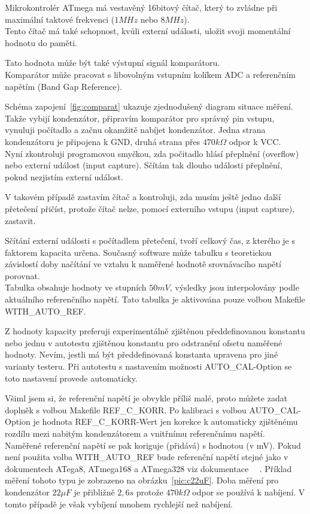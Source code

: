 Mikrokontrolér ATmega má vestavěný 16bitový čítač, který to zvládne při maximální taktové frekvenci (\(1MHz\) nebo \(8MHz\)).\\
Tento čítač má také schopnost, kvůli externí události, uložit svoji momentální hodnotu do paměti.

Tato hodnota může být také výstupní signál komparátoru.\\
Komparátor může pracovat s libovolným vstupním kolíkem ADC a referenčním napětím (Band Gap Reference).

Schéma zapojení~\ref{fig:comparat} ukazuje zjednodušený diagram situace měření.\\
Takže vybijí kondenzátor, připravím komparátor pro správný pin vstupu, vynuluji počítadlo a začnu okamžitě nabíjet kondenzátor.
Jedna strana kondenzátoru je připojena k GND, druhá strana přes \(470k\Omega\) odpor k VCC.\\
Nyní zkontroluji programovou smyčkou, zda počitadlo hlásí přeplnění (overflow) nebo externí událost (input capture).
Sčítám tak dlouho události přeplnění, pokud nezjistím externí událost.

V takovém případě zastavím čítač a kontroluji, zda musím ještě jedno další přetečení přičíst,
protože čítač nelze, pomocí externího vstupu (input capture), zastavit.

Sčítání externí události s počítadlem přetečení, tvoří celkový čas, z kterého je s faktorem kapacita určena.
Současný software může tabulku s teoretickou závislostí doby načítání ve vztahu k naměřené 
hodnotě srovnávacího napětí porovnat.\\
Tabulka obsahuje hodnoty ve stupních \(50mV\), výsledky jsou interpolovány podle aktuálního referenčního napětí.
Tato tabulka je aktivována pouze volbou Makefile WITH\_AUTO\_REF.

Z hodnoty kapacity preferuji experimentálně zjištěnou předdefinovanou konstantu nebo jednu v autotestu
zjištěnou konstantu pro odstranění ofsetu naměřené hodnoty.
Nevím, jestli má být předdefinovaná konstanta upravena pro jiné varianty testeru.
Při autotestu s nastavením možnosti AUTO\_CAL-Option se toto nastavení provede automaticky.

Všiml jsem si, že referenční napětí je obvykle příliš malé, proto můžete zadat doplněk s 
volbou Makefile REF\_C\_KORR.
Po kalibraci s volbou AUTO\_CAL-Option je hodnota REF\_C\_KORR-Wert jen korekce k automaticky
zjištěnému rozdílu mezi nabitým kondenzátorem a vnitřnímu referenčnímu napětí.\\
Naměřené referenční napětí se pak koriguje (přidává) s hodnotou (v mV).
Pokud není použita volba WITH\_AUTO\_REF bude referenční napětí stejné jako v
dokumentech ATega8, ATmega168 a ATmega328 viz dokumentace ~\cite{ATmega8}~\cite{ATmega168}.
Příklad měření tohoto typu je zobrazeno na obrázku~\ref{pic:c22uF}.
Doba měření pro kondenzátor \(22\mu F\)  je přibližně \(2,6s\) protože \(470k\Omega\) odpor se používá k nabíjení.
V tomto případě je však vybíjení mnohem rychlejší než nabíjení.


